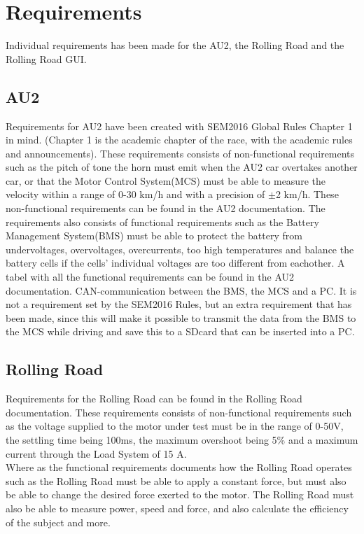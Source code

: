 \chapter{Requirements}
Individual requirements has been made for the AU2, the Rolling Road and the Rolling Road GUI.

\section{AU2}
Requirements for AU2 have been created with SEM2016 Global Rules Chapter 1 in mind. (Chapter 1 is the academic chapter of the race, with the academic rules and announcements). These requirements consists of non-functional requirements such as the pitch of tone the horn must emit when the AU2 car overtakes another car, or that the Motor Control System(MCS) must be able to measure the velocity within a range of 0-30 km/h and with a precision of $\pm$2 km/h. These non-functional requirements can be found in the AU2 documentation. The requirements also consists of functional requirements such as the Battery Management System(BMS) must be able to protect the battery from undervoltages, overvoltages, overcurrents, too high temperatures and balance the battery cells if the cells' individual voltages are too different from eachother. A tabel with all the functional requirements can be found in the AU2 documentation. CAN-communication between the BMS, the MCS and a PC. It is not a requirement set by the SEM2016 Rules, but an extra requirement that has been made, since this will make it possible to transmit the data from the BMS to the MCS while driving and save this to a SDcard that can be inserted into a PC.

\section{Rolling Road}
Requirements for the Rolling Road can be found in the Rolling Road documentation.
These requirements consists of non-functional requirements such as the voltage supplied to the motor under test must be in the range of 0-50V, the settling time being 100ms, the maximum overshoot being 5\% and a maximum current through the Load System of 15 A.\\
Where as the functional requirements documents how the Rolling Road operates such as the Rolling Road must be able to apply a constant force, but must also be able to change the desired force exerted to the motor. The Rolling Road must also be able to measure power, speed and force, and also calculate the efficiency of the subject and more.

